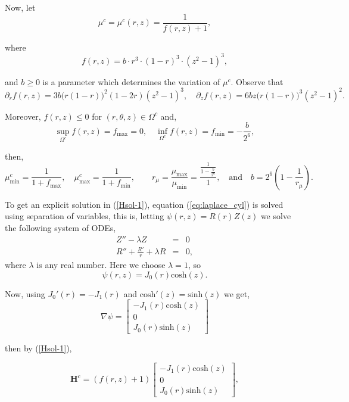 \documentclass[a4paper]{book}
\newcounter{number_tests_sfemans}
\newcounter{tests_sfemans}
\begin{document}
\noindent Now, let
\begin{equation}
{\mu^c}={\mu^c(r,z)}=\frac{1}{f(r,z)+1 },
\end{equation}

\noindent where $$f(r,z)= b \cdot r^3 \cdot (1-r)^3 \cdot (z^2-1)^3,$$
 
\noindent and  $b\geq 0 $ is a  parameter which determines the variation of ${\mu}^c$.
\noindent Observe that 
$$
\partial _r f(r,z) = 3b\big ( r(1-r)\big )^2(1-2r)(z^2-1)^3,
\quad
\partial _z f(r,z) = 6bz\big  (r(1-r))^3 (z^2-1)^2.
$$



Moreover,  $f (r,z) \leq 0$ for $(r,\theta,z) \in \Omega^c$ and,
$$
\sup _{\Omega^c} f(r,z)=f_{\text{max}}=0 , 
\quad 
\inf _{\Omega^c} f(r,z)=f_{\text{min}}= -\frac{b}{2^6}, 
$$

\noindent then,
$$
\mu_{\text{min}} ^c = \frac{1}{1 + f_{\text{max}}},\quad   \mu_{\text{max}} ^c =\frac{1}{1 + f_{\text{min}}},
 \quad  \quad r_{\mu}=\frac{\mu _{\text{max}}}{\mu _{\text{min}}}=\frac{\frac{1}{1-\frac{b}{2^6}}}{1}, \quad \text{and} \quad b= 2^6\left (1- \frac{1}{r_{\mu}}\right).
$$



\noindent To get an explicit solution in (\ref{Hsol-1}),  equation (\ref{eq:laplace_cyl}) is solved using separation of variables, this is, letting
$\psi(r,z)=R(r)Z(z)$ we solve the following system of ODEs,
\begin{eqnarray*}
Z''-\lambda Z & = & 0 \\
R''+\frac{R'}{r}+\lambda  R & = & 0,
\end{eqnarray*}
where $\lambda$ is any real number. Here we choose $\lambda=1$, so
\begin{equation}
\label{psi-sol1}
\psi(r,z)=J_0(r)\text{cosh}(z).
\end{equation}

\noindent Now, using $J_0'(r)=-J_1(r)$ and $\text{cosh}'(z)=\text{sinh}(z)$  we get,
\begin{equation}
\nabla \psi = \left[ \begin{array}{c} -J_1 (r)  \text{cosh}(z) \\ 0 \\J_0 (r)  \text{sinh}(z) \end{array} \right]
\end{equation}

\noindent then by (\ref{Hsol-1}), 

\begin{equation}
\mathbf{H}^c=(f(r,z)+1)
\left[ \begin{array}{c} -J_1 (r)  \text{cosh}(z) \\ 0 \\J_0 (r)  \text{sinh}(z) \end{array} \right],
\end{equation}
\end{document}
